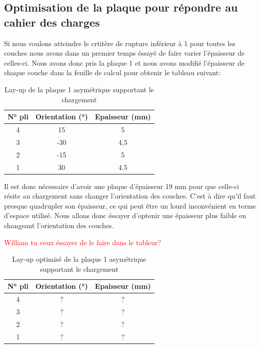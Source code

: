\documentclass[a4paper,12pt]{article}
\begin{document}
\subsection {Optimisation de la plaque pour répondre au cahier des charges}
Si nous voulons atteindre le crtitère de rupture inférieur à 1 pour toutes les couches nous avons dans un premier temps éssayé de faire varier l'épaisseur de celles-ci. Nous avons donc pris la plaque 1 et nous avons modifié l'épaisseur de chaque couche dans la feuille de calcul pour obtenir le tableau suivant:

\begin{table}[h!]
	\renewcommand{\arraystretch}{1.2} %
	\centering
	\begin{tabular}{c|c|c}
		\textbf{N° pli} & \textbf{Orientation (°)} & \textbf{Epaisseur (mm)} \\
		\hline
		4         & 15              & 5            \\
		3          & -30              & 4,5            \\
		2          & -15              & 5          \\
		1         & 30             & 4.5         \\
	\end{tabular}
	\caption{Lay-up de la plaque 1 asymétrique supportant le chargement}
	\label{tab:lay up opti epaisseur}
\end{table}

Il est donc nécessaire d'avoir une plaque d'épaisseur 19 mm pour que celle-ci résite au chargement sans changer l'orientation des couches. C'est à dire qu'il faut presque quadrupler son épaisseur, ce qui peut être un lourd inconvénient en terme d'espace utilisé. Nous allons donc éssayer d'optenir une épaisseur plus faible en changeant l'orientation des couches. 

\textcolor{red}{William tu veux éssayer de le faire dans le tableur?}

\begin{table}[h!]
	\renewcommand{\arraystretch}{1.2} %
	\centering
	\begin{tabular}{c|c|c}
		\textbf{N° pli} & \textbf{Orientation (°)} & \textbf{Epaisseur (mm)} \\
		\hline
		4         & ?              & ?           \\
		3          & ?              & ?           \\
		2          & ?            & ?          \\
		1         & ?             & ?        \\
	\end{tabular}
	\caption{Lay-up optimisé de la plaque 1 asymétrique supportant le chargement}
	\label{tab:lay up opti epaisseur orientation}
\end{table}
\end{document}
